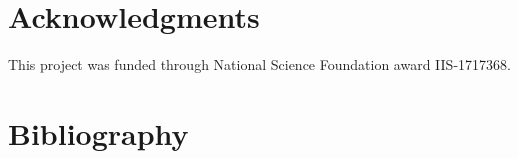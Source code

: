 \documentclass[preprint,review,times,12pt]{elsarticle}
\begin{document}
\section{Acknowledgments}
This project was funded through National Science Foundation award IIS-1717368. 


\section{Bibliography}

\end{document}
